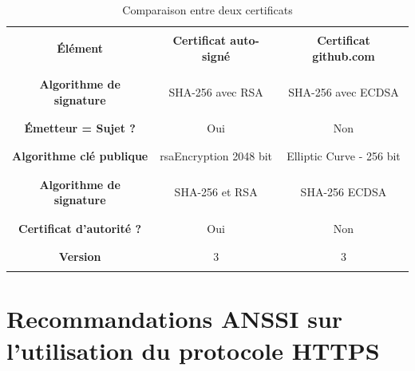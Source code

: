 \documentclass[12pt,a4paper]{article}
\begin{document}
\begin{table}[!h]
	\centering
		\begin{tabular}{|c|c|c|}
			\hline
			& &\\
			\textbf{Élément} & \textbf{Certificat auto-signé} & \textbf{Certificat github.com} \\ 
			& &\\ \hline
			& & \\
			\textbf{Algorithme de signature} & SHA-256 avec RSA & SHA-256 avec ECDSA \\ 
			& &\\ \hline
			& &\\
			\textbf{Émetteur = Sujet ?} & Oui & Non \\ 
			& &\\ \hline
			& &\\
			\textbf{Algorithme clé publique} & rsaEncryption 2048 bit & Elliptic Curve - 256 bit\\ 
			& &\\ \hline
			& &\\
			\textbf{Algorithme de signature} & SHA-256 et RSA & SHA-256 ECDSA \\
			& &\\ \hline
			& &\\
			\textbf{Certificat d'autorité ?} & Oui & Non \\ 
			& &\\ \hline
			& &\\
			\textbf{Version} & 3 & 3 \\ 
			& &\\ \hline
		\end{tabular}
	\caption{Comparaison entre deux certificats}
\end{table}	


\newpage

\section{Recommandations ANSSI sur l'utilisation du protocole HTTPS}
 
\end{document}

